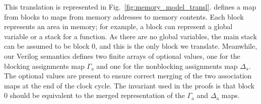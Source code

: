 This translation is represented in Fig.~\ref{fig:memory_model_transl}.  \compcert{} defines a map from blocks to maps from memory addresses to memory contents.  Each block represents an area in memory; for example, a block can represent a global variable or a stack for a function. As there are no global variables, the main stack can be assumed to be block 0, and this is the only block we translate.
Meanwhile, our Verilog semantics defines two finite arrays of optional values, one for the blocking assignments map $\Gamma_{\mathrm{a}}$ and one for the nonblocking assignments map $\Delta_{\mathrm{a}}$.
The optional values are present to ensure correct merging of the two association maps at the end of the clock cycle. %
The invariant used in the proofs is that block 0 should be equivalent to the merged representation of the $\Gamma_{\mathrm{a}}$ and $\Delta_{\mathrm{a}}$ maps.


